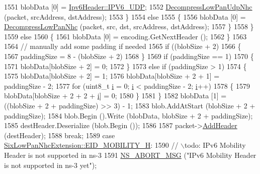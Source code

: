 \begin{DoxyCode}
1551               blobData [0] = \hyperlink{classns3_1_1Ipv6Header_a226429221a066c5e3b1f260caf27d1e9aef42146d6b211521c22f827b04530253}{Ipv6Header::IPV6\_UDP};
1552               \hyperlink{classns3_1_1SixLowPanNetDevice_a0b31fbe0bdc3a4dd59b9f7426aec8ed8}{DecompressLowPanUdpNhc} (packet, srcAddress, dstAddress);
1553             \}
1554           \textcolor{keywordflow}{else}
1555             \{
1556               blobData [0] = \hyperlink{classns3_1_1SixLowPanNetDevice_af69701425fa2e02ab4a7fdcd1db99cc8}{DecompressLowPanNhc} (packet, src, dst, srcAddress, 
      dstAddress);
1557             \}
1558         \}
1559       \textcolor{keywordflow}{else}
1560         \{
1561           blobData [0] = encoding.GetNextHeader ();
1562         \}
1563 
1564       \textcolor{comment}{// manually add some padding if needed}
1565       \textcolor{keywordflow}{if} ((blobSize + 2) %
1566         \{
1567           paddingSize = 8 - (blobSize + 2) %
1568         \}
1569       \textcolor{keywordflow}{if} (paddingSize == 1)
1570         \{
1571           blobData[blobSize + 2] = 0;
1572         \}
1573       \textcolor{keywordflow}{else} \textcolor{keywordflow}{if} (paddingSize > 1)
1574         \{
1575           blobData[blobSize + 2] = 1;
1576           blobData[blobSize + 2 + 1] = paddingSize - 2;
1577           \textcolor{keywordflow}{for} (uint8\_t \hyperlink{bernuolliDistribution_8m_a6f6ccfcf58b31cb6412107d9d5281426}{i} = 0; \hyperlink{bernuolliDistribution_8m_a6f6ccfcf58b31cb6412107d9d5281426}{i} < paddingSize - 2; \hyperlink{bernuolliDistribution_8m_a6f6ccfcf58b31cb6412107d9d5281426}{i}++)
1578             \{
1579               blobData[blobSize + 2 + 2 + \hyperlink{bernuolliDistribution_8m_a6f6ccfcf58b31cb6412107d9d5281426}{i}] = 0;
1580             \}
1581         \}
1582       blobData [1] = ((blobSize + 2 + paddingSize) >> 3) - 1;
1583       blob.AddAtStart (blobSize + 2 + paddingSize);
1584       blob.Begin ().Write (blobData, blobSize + 2 + paddingSize);
1585       destHeader.Deserialize (blob.Begin ());
1586 
1587       packet->\hyperlink{classns3_1_1Packet_a465108c595a0bc592095cbcab1832ed8}{AddHeader} (destHeader);
1588       \textcolor{keywordflow}{break};
1589     \textcolor{keywordflow}{case} \hyperlink{classns3_1_1SixLowPanNhcExtension_ac692a22abe80c30bcbafa57ef36bf5adadc134cf7c28a525ec3953173260c1166}{SixLowPanNhcExtension::EID\_MOBILITY\_H}:
1590       \textcolor{comment}{// \(\backslash\)todo: IPv6 Mobility Header is not supported in ns-3}
1591       \hyperlink{group__fatal_ga51ac4699be799d772ae7258d1ef6af21}{NS\_ABORT\_MSG} (\textcolor{stringliteral}{"IPv6 Mobility Header is not supported in ns-3 yet"});

\end{DoxyCode}
